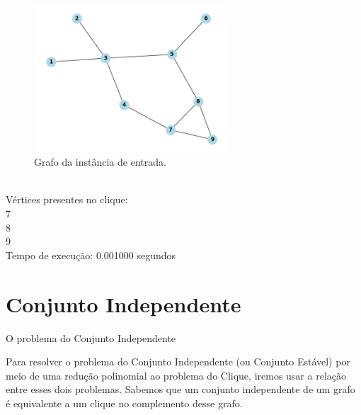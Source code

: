 \documentclass[compress,aspectratio=169]{beamer}
\begin{document}
    \begin{frame}
        \begin{figure}[H]
            \centering
            \includegraphics[width=0.65\textwidth]{images/grafo_instancia1.png}
            \caption{Grafo da instância de entrada.}
            \label{fig:instancia1Clique}
        \end{figure}
    \end{frame} 

    \begin{frame}
        \begin{tcolorbox}[title=Saída da instância de entrada, width=\linewidth, 
          fontupper=\ttfamily, 
          halign=flush left]
            [0, 0, 0, 0, 0, 0, 1, 1, 1] \\
            Vértices presentes no clique: \\
            7 \\
            8 \\
            9 \\
            Tempo de execução: 0.001000 segundos \\
        \end{tcolorbox}
    \end{frame}

\section{Conjunto Independente}
    \begin{frame}{O problema do Conjunto Independente}
    \begin{justify}
        Para resolver o problema do Conjunto Independente (ou Conjunto Estável) por meio de uma redução polinomial ao problema do Clique, iremos usar a relação entre esses dois problemas. Sabemos que um conjunto independente de um grafo é equivalente a um clique no complemento desse grafo.
    \end{justify}
    \end{frame}
\end{document}

